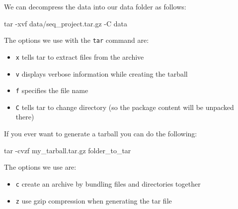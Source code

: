 \documentclass[
  letterpaper,
  DIV=11,
  numbers=noendperiod]{scrreprt}
\newenvironment{Shaded}{}{}
\newcommand{\AttributeTok}[1]{\textcolor[rgb]{0.84,0.23,0.29}{#1}}
\newcommand{\FunctionTok}[1]{\textcolor[rgb]{0.44,0.26,0.76}{#1}}
\newcommand{\NormalTok}[1]{\textcolor[rgb]{0.14,0.16,0.18}{#1}}
\providecommand{\tightlist}{%
  \setlength{\itemsep}{0pt}\setlength{\parskip}{0pt}}\usepackage{longtable,booktabs,array}
\begin{document}
We can decompress the data into our data folder as follows:

\begin{Shaded}
\begin{Highlighting}[]
\FunctionTok{tar} \AttributeTok{{-}xvf}\NormalTok{ data/seq\_project.tar.gz }\AttributeTok{{-}C}\NormalTok{ data}
\end{Highlighting}
\end{Shaded}

The options we use with the \texttt{tar} command are:

\begin{itemize}
\tightlist
\item
  \texttt{x} tells tar to extract files from the archive
\item
  \texttt{v} displays verbose information while creating the tarball
\item
  \texttt{f} specifies the file name
\item
  \texttt{C} tells tar to change directory (so the package content will
  be unpacked there)
\end{itemize}

\begin{tcolorbox}[enhanced jigsaw, colframe=quarto-callout-tip-color-frame, colbacktitle=quarto-callout-tip-color!10!white, opacitybacktitle=0.6, breakable, titlerule=0mm, colback=white, toptitle=1mm, leftrule=.75mm, opacityback=0, coltitle=black, left=2mm, toprule=.15mm, bottomtitle=1mm, rightrule=.15mm, title=\textcolor{quarto-callout-tip-color}{\faLightbulb}\hspace{0.5em}{Tip: how to generate a tarball}, bottomrule=.15mm, arc=.35mm]

If you ever want to generate a tarball you can do the following:

\begin{Shaded}
\begin{Highlighting}[]
\FunctionTok{tar} \AttributeTok{{-}cvzf}\NormalTok{ my\_tarball.tar.gz folder\_to\_tar}
\end{Highlighting}
\end{Shaded}

The options we use are:

\begin{itemize}
\tightlist
\item
  \texttt{c} create an archive by bundling files and directories
  together
\item
  \texttt{z} use gzip compression when generating the tar file
\end{itemize}

\end{tcolorbox}
\end{document}
